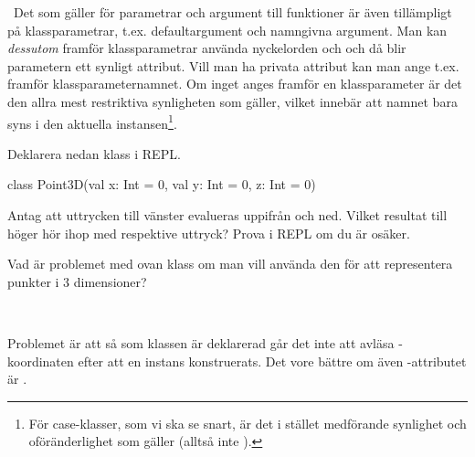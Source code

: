 
\QUESTBEGIN

\Task \what~Det som gäller för parametrar och argument till funktioner är även tillämpligt på klassparametrar, t.ex. defaultargument och namngivna argument. Man kan \emph{dessutom} framför klassparametrar använda nyckelorden  och  och då blir parametern ett synligt attribut. Vill man ha privata attribut kan man ange t.ex.  framför klassparameternamnet.
Om inget anges framför en klassparameter är det den allra mest restriktiva synligheten  som gäller, vilket innebär att namnet bara syns i den aktuella instansen\footnote{För case-klasser, som vi ska se snart, är det i stället  medförande synlighet och oföränderlighet som gäller (alltså inte ).}.

Deklarera nedan klass i REPL.

\begin{Code}
class Point3D(val x: Int = 0, val y: Int = 0, z: Int = 0)
\end{Code}

\Subtask Antag att uttrycken till vänster evalueras uppifrån och ned. Vilket resultat till höger hör ihop med respektive uttryck? Prova i REPL om du är osäker.

\begin{ConceptConnections}

\end{ConceptConnections}

\Subtask Vad är problemet med ovan klass om man vill använda den för att representera punkter i 3 dimensioner?

\SOLUTION

\TaskSolved \what~

\SubtaskSolved

\begin{ConceptConnections}

\end{ConceptConnections}

\SubtaskSolved Problemet är att så som klassen  är deklarerad går det inte att avläsa -koordinaten efter att en instans konstruerats. Det vore bättre om även -attributet är .

\QUESTEND




